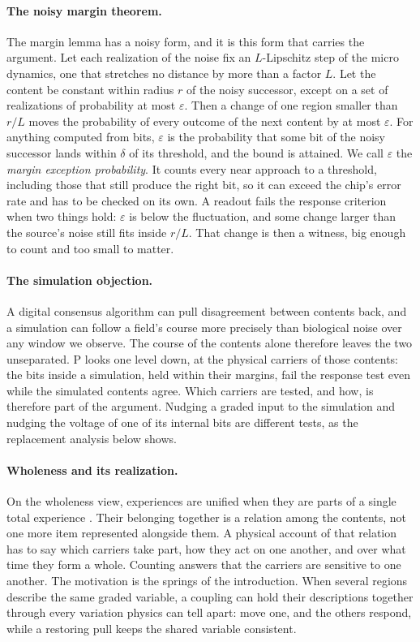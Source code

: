 \documentclass[12pt]{article}
\begin{document}
\paragraph{The noisy margin theorem.} The margin lemma has a noisy form, and it
is this form that carries the argument. Let each realization of the noise fix an
$L$-Lipschitz step of the micro dynamics, one that stretches no distance by more
than a factor $L$. Let the content be constant within radius $r$ of the noisy
successor, except on a set of realizations of probability at most
$\varepsilon$. Then a change of one region smaller than $r/L$ moves the
probability of every outcome of the next content by at most $\varepsilon$. For
anything computed from bits, $\varepsilon$ is the probability that some bit of
the noisy successor lands within $\delta$ of its threshold, and the bound is
attained. We call $\varepsilon$ the \emph{margin exception probability}. It
counts every near approach to a threshold, including those that still produce
the right bit, so it can exceed the chip's error rate and has to be checked on
its own. A readout fails the response criterion when two things hold:
$\varepsilon$ is below the fluctuation, and some change larger than the
source's noise still fits inside $r/L$. That change is then a witness, big
enough to count and too small to matter.

\paragraph{The simulation objection.} A digital consensus algorithm can pull
disagreement between contents back, and a simulation can follow a field's
course more precisely than biological noise over any window we observe. The
course of the contents alone therefore leaves the two unseparated. P looks one
level down, at the physical carriers of those contents: the bits inside a
simulation, held within their margins, fail the response test even while the
simulated contents agree. Which carriers are tested, and how, is therefore part
of the argument. Nudging a graded input to the simulation and nudging the
voltage of one of its internal bits are different tests, as the replacement
analysis below shows.

\paragraph{Wholeness and its realization.} On the wholeness view, experiences
are unified when they are parts of a single total experience \citep{bayne2010}.
Their belonging together is a relation among the contents, not one more item
represented alongside them. A physical account of that relation has to say
which carriers take part, how they act on one another, and over what time they
form a whole. Counting answers that the carriers are sensitive to one another.
The motivation is the springs of the introduction. When several regions
describe the same graded variable, a coupling can hold their descriptions
together through every variation physics can tell apart: move one, and the
others respond, while a restoring pull keeps the shared variable consistent.
\end{document}

